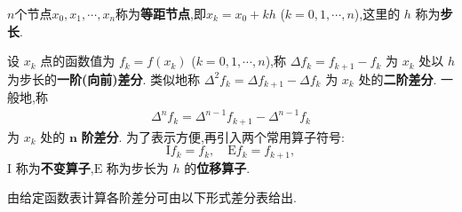 \documentclass[../../main.tex]{subfiles}
\begin{document}
\begin{definition}\label{definition:差分定义}
$n$个节点$x_0,x_1,\cdots,x_n$称为\textbf{等距节点},即$x_k = x_0 + kh$ ($k = 0, 1, \cdots, n$),这里的 $h$ 称为\textbf{步长}.

设 $x_k$ 点的函数值为 $f_k = f(x_k)$ ($k = 0, 1, \cdots, n$),称 $\Delta f_k = f_{k+1} - f_k$ 为 $x_k$ 处以 $h$ 为步长的\textbf{一阶(向前)差分}. 类似地称 $\Delta^2 f_k = \Delta f_{k+1} - \Delta f_k$ 为 $x_k$ 处的\textbf{二阶差分}. 一般地,称
\begin{align}
\Delta^n f_k = \Delta^{n-1} f_{k+1} - \Delta^{n-1} f_k \label{eq:数值分析-3.8}
\end{align}
为 $x_k$ 处的 $\boldsymbol{n}$ \textbf{阶差分}. 为了表示方便,再引入两个常用算子符号:
\[
\mathrm{I}f_k = f_k, \quad \mathrm{E}f_k = f_{k+1},
\]
$\mathrm{I}$ 称为\textbf{不变算子},$\mathrm{E}$ 称为步长为 $h$ 的\textbf{位移算子}.
\end{definition}

由给定函数表计算各阶差分可由以下形式差分表给出.
\begin{table}[H]
\scriptsize
\centering
\caption{}
\label{table:差分表}
\end{table}
\end{document}
